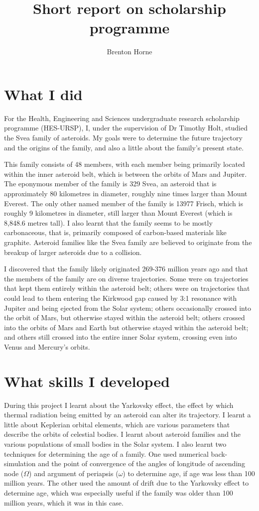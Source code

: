 \documentclass[12pt,a4paper,openright]{article}
\title{Short report on scholarship programme}
\author{Brenton Horne}
\begin{document}
\maketitle

\section{What I did}
For the Health, Engineering and Sciences undergraduate research scholarship programme (HES-URSP), I, under the supervision of Dr Timothy Holt, studied the Svea family of asteroids. My goals were to determine the future trajectory and the origins of the family, and also a little about the family's present state. 

This family consists of 48 members, with each member being primarily located within the inner asteroid belt, which is between the orbits of Mars and Jupiter. The eponymous member of the family is 329 Svea, an asteroid that is approximately 80 kilometres in diameter, roughly nine times larger than Mount Everest. The only other named member of the family is 13977 Frisch, which is roughly 9 kilometres in diameter, still larger than Mount Everest (which is 8,848.6 metres tall). I also learnt that the family seems to be mostly carbonaceous, that is, primarily composed of carbon-based materials like graphite. Asteroid families like the Svea family are believed to originate from the breakup of larger asteroids due to a collision. 

I discovered that the family likely originated 269-376 million years ago and that the members of the family are on diverse trajectories. Some were on trajectories that kept them entirely within the asteroid belt; others were on trajectories that could lead to them entering the Kirkwood gap caused by 3:1 resonance with Jupiter and being ejected from the Solar system; others occasionally crossed into the orbit of Mars, but otherwise stayed within the asteroid belt; others crossed into the orbits of Mars and Earth but otherwise stayed within the asteroid belt; and others still crossed into the entire inner Solar system, crossing even into Venus and Mercury's orbits. 

\section{What skills I developed}
During this project I learnt about the Yarkovsky effect, the effect by which thermal radiation being emitted by an asteroid can alter its trajectory. I learnt a little about Keplerian orbital elements, which are various parameters that describe the orbits of celestial bodies. I learnt about asteroid families and the various populations of small bodies in the Solar system. I also learnt two techniques for determining the age of a family. One used numerical back-simulation and the point of convergence of the angles of longitude of ascending node ($\Omega$) and argument of periapsis ($\omega$) to determine age, if age was less than 100 million years. The other used the amount of drift due to the Yarkovsky effect to determine age, which was especially useful if the family was older than 100 million years, which it was in this case. 
\end{document}
